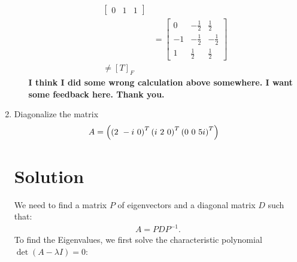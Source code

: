 \begin{enumerate}
\begin{enumerate}[label={(\alph*)}]
\begin{align*}
\begin{bmatrix}
           0&1&1
        \end{bmatrix}\\
        &=\begin{bmatrix}
            0 & \displaystyle-\frac{1}{2} & \displaystyle\frac{1}{2}\\[10pt]
            -1 & -\displaystyle\frac{1}{2} & -\displaystyle\frac{1}{2}\\[10pt]
            1 & \displaystyle\frac{1}{2} & \displaystyle\frac{1}{2}
        \end{bmatrix}\\
        \neq [T]_F
    \end{align*}
    \textbf{I think I did some wrong calculation above somewhere. I want some feedback here. Thank you.}
    \end{enumerate}
    \bigskip\bigskip\hline\hline\bigskip
    \item Diagonalize the matrix
        \begin{align}
            A &= \left(
            \left(2 \ - i \ 0\right)^T 
            \left(i \ 2 \ 0\right)^T
            \left(0 \ 0 \ 5i\right)^T
            \right)\notag
        \end{align}
    \section*{Solution}
    We need to find a matrix $P$ of eigenvectors and a diagonal matrix $D$ such that:
\begin{align*}
    A = PDP^{-1}.
\end{align*}
To find the Eigenvalues, we first solve the characteristic polynomial $\displaystyle\det(A - \lambda I) = 0$:


\end{enumerate}
